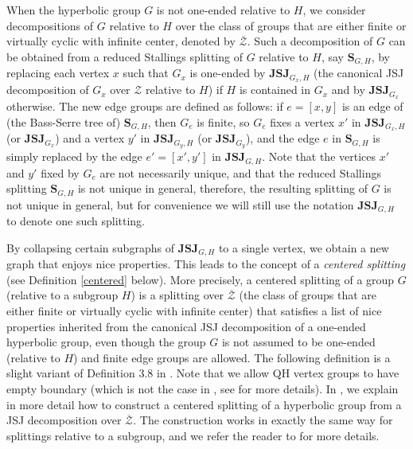 \documentclass[a4paper, 11pt]{amsart}
\theoremstyle{definition}
\theoremstyle{remark}
\begin{document}
When the hyperbolic group $G$ is not one-ended relative to $H$, we consider decompositions of $G$ relative to $H$ over the class of groups that are either finite or virtually cyclic with infinite center, denoted by $\overline{\mathcal{Z}}$. Such a decomposition of $G$ can be obtained from a reduced Stallings splitting of $G$ relative to $H$, say $\mathbf{S}_{G,H}$, by replacing each vertex $x$ such that $G_x$ is one-ended by $\mathbf{JSJ}_{G_x,H}$ (the canonical JSJ decomposition of $G_x$ over $\mathcal{Z}$ relative to $H$) if $H$ is contained in $G_x$ and by $\mathbf{JSJ}_{G_x}$ otherwise. The new edge groups are defined as follows: if $e=[x,y]$ is an edge of (the Bass-Serre tree of) $\mathbf{S}_{G,H}$, then $G_e$ is finite, so $G_e$ fixes a vertex $x'$ in $\mathbf{JSJ}_{G_x,H}$ (or $\mathbf{JSJ}_{G_x}$) and a vertex $y'$ in $\mathbf{JSJ}_{G_y,H}$ (or $\mathbf{JSJ}_{G_y}$), and the edge $e$ in $\mathbf{S}_{G,H}$ is simply replaced by the edge $e'=[x',y']$ in $\mathbf{JSJ}_{G,H}$. Note that the vertices $x'$ and $y'$ fixed by $G_e$ are not necessarily unique, and that the reduced Stallings splitting $\mathbf{S}_{G,H}$ is not unique in general, therefore, the resulting splitting of $G$ is not unique in general, but for convenience we will still use the notation $\mathbf{JSJ}_{G,H}$ to denote one such splitting.

By collapsing certain subgraphs of $\mathbf{JSJ}_{G,H}$ to a single vertex, we obtain a new graph that enjoys nice properties. This leads to the concept of a \emph{centered splitting} (see Definition \ref{centered} below). More precisely, a centered splitting of a group $G$ (relative to a subgroup $H$) is a splitting over $\overline{\mathcal{Z}}$ (the class of groups that are either finite or virtually cyclic with infinite center) that satisfies a list of nice properties inherited from the canonical JSJ decomposition of a one-ended hyperbolic group, even though the group $G$ is not assumed to be one-ended (relative to $H$) and finite edge groups are allowed. The following definition is a slight variant of Definition 3.8 in \cite{And18}. Note that we allow QH vertex groups to have empty boundary (which is not the case in \cite{And18}, see \cite{AP24} for more details). In \cite[Section 4.4.2]{AP24}, we explain in more detail how to construct a centered splitting of a hyperbolic group from a JSJ decomposition over $\overline{\mathcal{Z}}$. The construction works in exactly the same way for splittings relative to a subgroup, and we refer the reader to \cite[Section 4.4.2]{AP24} for more details.
\end{document}
